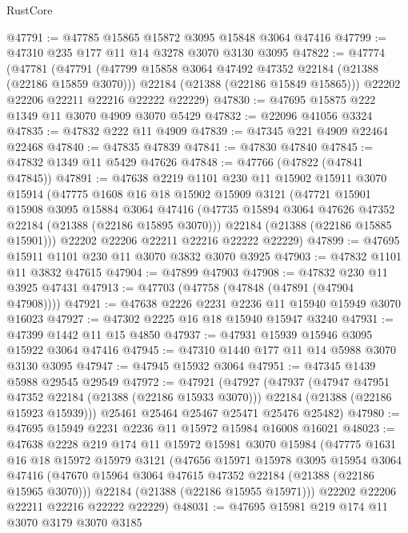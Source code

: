 \begin{lexlean}{RustCore}
\begin{coremodule}
@47791 := @47785 @15865 @15872 @3095 @15848 @3064 @47416
@47799 := @47310 @235 @177 @11 @14 @3278 @3070 @3130 @3095
@47822 := @47774
    (@47781
      (@47791
        (@47799 @15858 @3064 @47492 @47352 @22184 (@21388 (@22186 @15859 @3070)))
        @22184
        (@21388 (@22186 @15849 @15865)))
      @22202
      @22206
      @22211
      @22216
      @22222
      @22229)
@47830 := @47695 @15875 @222 @1349 @11 @3070 @4909 @3070 @5429
@47832 := @22096 @41056 @3324
@47835 := @47832 @222 @11 @4909
@47839 := @47345 @221 @4909 @22464 @22468
@47840 := @47835 @47839
@47841 := @47830 @47840
@47845 := @47832 @1349 @11 @5429 @47626
@47848 := @47766 (@47822 (@47841 @47845))
@47891 := @47638
    @2219
    @1101
    @230
    @11
    @15902
    @15911
    @3070
    @15914
    (@47775
      @1608
      @16
      @18
      @15902
      @15909
      @3121
      (@47721
        @15901
        @15908
        @3095
        @15884
        @3064
        @47416
        (@47735 @15894 @3064 @47626 @47352 @22184 (@21388 (@22186 @15895 @3070)))
        @22184
        (@21388 (@22186 @15885 @15901)))
      @22202
      @22206
      @22211
      @22216
      @22222
      @22229)
@47899 := @47695 @15911 @1101 @230 @11 @3070 @3832 @3070 @3925
@47903 := @47832 @1101 @11 @3832 @47615
@47904 := @47899 @47903
@47908 := @47832 @230 @11 @3925 @47431
@47913 := @47703 (@47758 (@47848 (@47891 (@47904 @47908))))
@47921 := @47638 @2226 @2231 @2236 @11 @15940 @15949 @3070 @16023
@47927 := @47302 @2225 @16 @18 @15940 @15947 @3240
@47931 := @47399 @1442 @11 @15 @4850
@47937 := @47931 @15939 @15946 @3095 @15922 @3064 @47416
@47945 := @47310 @1440 @177 @11 @14 @5988 @3070 @3130 @3095
@47947 := @47945 @15932 @3064
@47951 := @47345 @1439 @5988 @29545 @29549
@47972 := @47921
    (@47927
      (@47937
        (@47947 @47951 @47352 @22184 (@21388 (@22186 @15933 @3070)))
        @22184
        (@21388 (@22186 @15923 @15939)))
      @25461
      @25464
      @25467
      @25471
      @25476
      @25482)
@47980 := @47695 @15949 @2231 @2236 @11 @15972 @15984 @16008 @16021
@48023 := @47638
    @2228
    @219
    @174
    @11
    @15972
    @15981
    @3070
    @15984
    (@47775
      @1631
      @16
      @18
      @15972
      @15979
      @3121
      (@47656
        @15971
        @15978
        @3095
        @15954
        @3064
        @47416
        (@47670 @15964 @3064 @47615 @47352 @22184 (@21388 (@22186 @15965 @3070)))
        @22184
        (@21388 (@22186 @15955 @15971)))
      @22202
      @22206
      @22211
      @22216
      @22222
      @22229)
@48031 := @47695 @15981 @219 @174 @11 @3070 @3179 @3070 @3185

\end{coremodule}
\end{lexlean}
